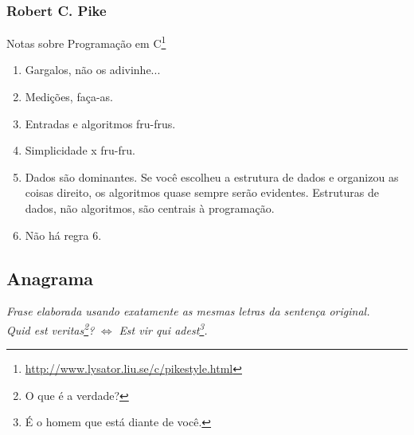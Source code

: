 \documentclass{UnBeamer}
\begin{document}
	\begin{frame}[label=main]
		\frametitle{Robert C. Pike}
		Notas sobre Programação em C\footnote{\url{http://www.lysator.liu.se/c/pikestyle.html}}
		\begin{enumerate}[<+->]
			\item Gargalos, não os adivinhe...%
			\item Medições, faça-as.%
			\item Entradas e algoritmos fru-frus.%
			\item Simplicidade x fru-fru. %
			\item \alert{Dados são dominantes.} Se você escolheu a estrutura de dados e organizou as coisas direito, os algoritmos quase sempre serão evidentes. Estruturas de dados, não algoritmos, são centrais à programação.%
			\item Não há regra 6. %
	    \end{enumerate}
	\end{frame}

	\newcommand{\descItem}[2]{\begin{description}\item[#1]#2\end{description}}%

	\subsection{Anagrama}
	\begin{frame}[label=main]
		\emph{Frase elaborada usando exatamente as mesmas letras da sentença original.}
		\\\pause\vfill
		\hfill
		\emph{Quid est veritas\footnote[frame]<2>{O que é a verdade?}?}
		\hfill
		$\Leftrightarrow$
		\hfill
		\emph{Est vir qui adest\footnote[frame]<2>{É o homem que está diante de você.}.}
		\hspace*{.2\textwidth}\vfill
	\end{frame}
\end{document}
